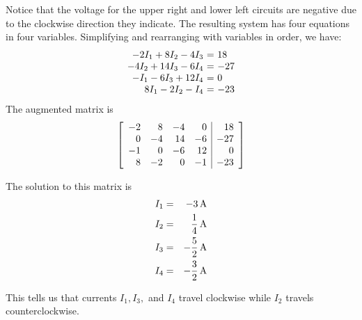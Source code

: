 \begin{solution}
Notice that the voltage for the upper right and lower left circuits
are negative due to the clockwise direction they indicate. The
resulting system has four equations in four variables.  Simplifying
and rearranging with variables in order, we have:
\begin{equation*}
  \begin{array}{r@{~}c@{~}l}
    -2I_{1}+8I_{2}-4I_{3}&=&18 \\
    - 4I_{2} + 14I_{3} - 6I_{4} &=& -27 \\
    -I_{1} - 6I_{3} + 12I_{4} &=& 0 \\
    8I_{1}-2I_{2} - I_{4} &=& -23
  \end{array}
\end{equation*}
The augmented matrix is 
\[
\left[
\begin{array}{rrrr|r}
-2 & 8 & -4 & 0 & 18 \\
0 & -4 & 14 & -6 & -27 \\
-1 & 0 & -6 & 12 & 0 \\
8 & -2 & 0 & -1 & -23
\end{array}
\right]
\]

The solution to this matrix is
\begin{eqnarray*}
I_{1} &=& -3 \mathop{\textrm{\rm A}}\nolimits\\
I_{2} &=& \frac{1}{4} \mathop{\textrm{\rm A}}\nolimits\\
I_{3} &=& -\frac{5}{2} \mathop{\textrm{\rm A}}\nolimits\\
I_{4} &=& -\frac{3}{2} \mathop{\textrm{\rm A}}\nolimits
\end{eqnarray*}

This tells us that currents $I_1, I_3,$ and $I_4$ travel clockwise while $I_2$ travels counterclockwise. 
\end{solution}
